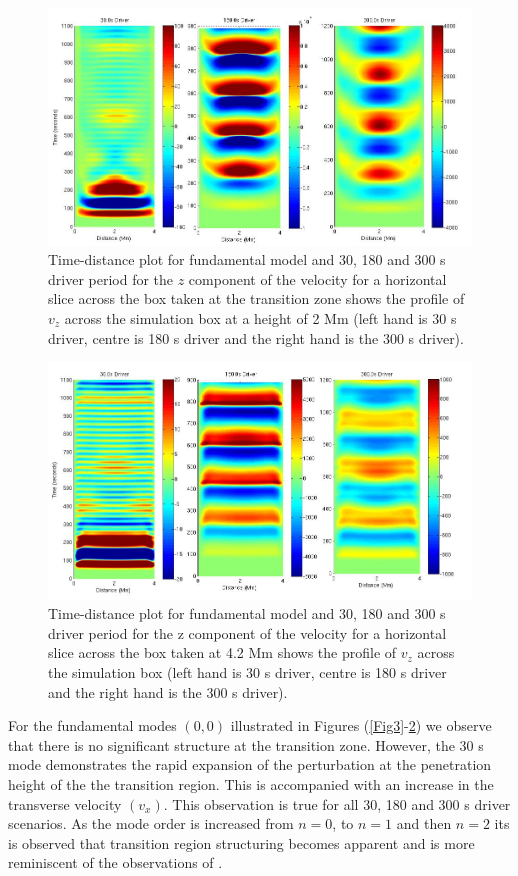 \documentclass[preprint,authoryear,12pt]{elsarticle}
\begin{document}
\begin{figure}[h]
\includegraphics[scale=0.4]{images/fig6_dt_30_180_300_0_horiz_2Mm.jpg}
\caption{Time-distance plot for fundamental model and 30, 180 and 300 s driver period for the $z$ component of the velocity for a horizontal slice across the box  taken at the transition zone shows  the profile of $v_{z}$ across the simulation box at a height of 2 Mm (left hand is 30 s driver, centre is 180 s driver and the right hand is the 300 s driver). }
\label{Fig5}
\end{figure}
\begin{figure}[h]
\includegraphics[scale=0.4]{images/fig7_dt_30_180_300_0_horiz_4p2Mm.jpg}
\caption{Time-distance plot for fundamental model and 30, 180 and 300 s driver period for the z component of the velocity for a horizontal slice across the box  taken at 4.2 Mm shows  the profile of $v_{z}$ across the simulation box (left hand is 30 s driver, centre is 180 s driver and the right hand is the 300 s driver). }
\label{Fig6}
\end{figure}
For the fundamental modes $(0, 0)$  illustrated in Figures (\ref{Fig3}-\ref{Fig6})  we observe that there is no significant structure at the transition zone. However, the 30 s mode demonstrates the rapid expansion of the perturbation at the penetration height of the the transition region. This is accompanied with an increase in the transverse velocity $(v_x)$. This observation is true for all 30, 180 and 300 s driver scenarios. As the mode order is increased from $n=0$, to $n=1$ and then $n=2$ its is observed that transition region structuring becomes apparent and is more reminiscent of the observations of \citet{Malins2007A}.
\end{document}
